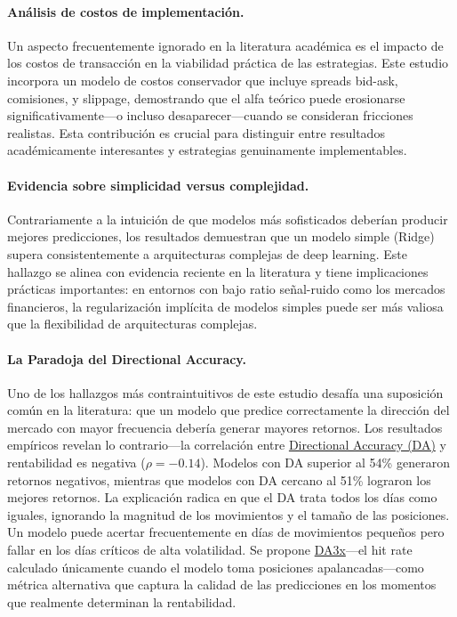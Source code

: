 \documentclass[11pt,a4paper]{article}
\newcommand{\gterm}[2]{\hyperref[glos:#1]{#2}}
\begin{document}
\paragraph*{Análisis de costos de implementación.} Un aspecto frecuentemente ignorado en la literatura académica es el impacto de los costos de transacción en la viabilidad práctica de las estrategias. Este estudio incorpora un modelo de costos conservador que incluye spreads bid-ask, comisiones, y slippage, demostrando que el alfa teórico puede erosionarse significativamente---o incluso desaparecer---cuando se consideran fricciones realistas. Esta contribución es crucial para distinguir entre resultados académicamente interesantes y estrategias genuinamente implementables.

\paragraph*{Evidencia sobre simplicidad versus complejidad.} Contrariamente a la intuición de que modelos más sofisticados deberían producir mejores predicciones, los resultados demuestran que un modelo simple (Ridge) supera consistentemente a arquitecturas complejas de deep learning. Este hallazgo se alinea con evidencia reciente en la literatura \citep{zeng2023} y tiene implicaciones prácticas importantes: en entornos con bajo ratio señal-ruido como los mercados financieros, la regularización implícita de modelos simples puede ser más valiosa que la flexibilidad de arquitecturas complejas.

\paragraph*{La Paradoja del Directional Accuracy.} Uno de los hallazgos más contraintuitivos de este estudio desafía una suposición común en la literatura: que un modelo que predice correctamente la dirección del mercado con mayor frecuencia debería generar mayores retornos. Los resultados empíricos revelan lo contrario---la correlación entre \gterm{da}{Directional Accuracy (DA)} y rentabilidad es negativa ($\rho = -0.14$). Modelos con DA superior al 54\% generaron retornos negativos, mientras que modelos con DA cercano al 51\% lograron los mejores retornos. La explicación radica en que el DA trata todos los días como iguales, ignorando la magnitud de los movimientos y el tamaño de las posiciones. Un modelo puede acertar frecuentemente en días de movimientos pequeños pero fallar en los días críticos de alta volatilidad. Se propone \gterm{da3x}{DA3x}---el hit rate calculado únicamente cuando el modelo toma posiciones apalancadas---como métrica alternativa que captura la calidad de las predicciones en los momentos que realmente determinan la rentabilidad.
\end{document}
